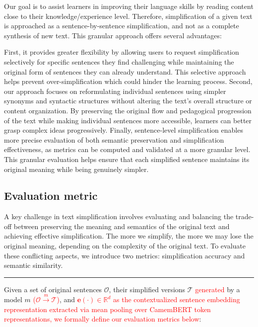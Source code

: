 Our goal is to assist learners in improving their language skills by reading content close to their knowledge/experience level. Therefore, simplification of a given text is approached as a sentence-by-sentence simplification, and not as a complete synthesis of new text. This granular approach offers several advantages:

First, it provides greater flexibility by allowing users to request simplification selectively for specific sentences they find challenging while maintaining the original form of sentences they can already understand. This selective approach helps prevent over-simplification which could hinder the learning process. Second, our approach focuses on reformulating individual sentences using simpler synonyms and syntactic structures without altering the text's overall structure or content organization. By preserving the original flow and pedagogical progression of the text while making individual sentences more accessible, learners can better grasp complex ideas progressively. Finally, sentence-level simplification enables more precise evaluation of both semantic preservation and simplification effectiveness, as metrics can be computed and validated at a more granular level. This granular evaluation helps ensure that each simplified sentence maintains its original meaning while being genuinely simpler. 




\subsection{Evaluation metric}

A key challenge in text simplification involves evaluating and balancing the trade-off between preserving the meaning and semantics of the original text and achieving effective simplification. The more we simplify, the more we may lose the original meaning, depending on the complexity of the original text. To evaluate these conflicting aspects, we introduce two metrics: simplification accuracy and semantic similarity.

\noindent\rule{\textwidth}{0.4pt}

Given a set of original sentences $\mathcal{O}$, their simplified versions $\mathcal{T}$ \textcolor{red}{generated} by a model $m$ \textcolor{red}{($\mathcal{O} \overset{m}{\longrightarrow} \mathcal{T}$)}, and \textcolor{red}{$\mathbf{e}(\cdot) \in \mathbb{R}^d$ as the contextualized sentence embedding representation extracted via mean pooling over CamemBERT token representations, we formally define our evaluation metrics below}:

